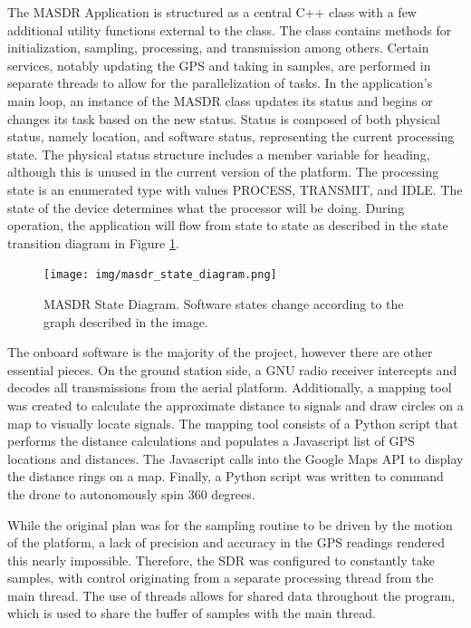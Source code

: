 The MASDR Application is structured as a central C++ class with a few additional utility functions external to the class. The class contains methods for initialization, sampling, processing, and transmission among others. Certain services, notably updating the GPS and taking in samples, are performed in separate threads to allow for the parallelization of tasks. In the application’s main loop, an instance of the MASDR class updates its status and begins or changes its task based on the new status. Status is composed of both physical status, namely location, and software status, representing the current processing state. The physical status structure includes a member variable for heading, although this is unused in the current version of the platform. The processing state is an enumerated type with values PROCESS, TRANSMIT, and IDLE. The state of the device determines what the processor will be doing. During operation, the application will flow from state to state as described in the state transition diagram in Figure \ref{fig:state_diagram}. \par
\begin{figure}[ht]
\centering
\texttt{[image: img/masdr\_state\_diagram.png]}
\caption{MASDR State Diagram. Software states change according to the graph described in the image.}
\label{fig:state_diagram}
\end{figure}
The onboard software is the majority of the project, however there are other essential pieces. On the ground station side, a GNU radio receiver intercepts and decodes all transmissions from the aerial platform. Additionally, a mapping tool was created to calculate the approximate distance to signals and draw circles on a map to visually locate signals. The mapping tool consists of a Python script that performs the distance calculations and populates a Javascript list of GPS locations and distances. The Javascript calls into the Google Maps API to display the distance rings on a map. Finally, a Python script was written to command the drone to autonomously spin 360 degrees. \par
While the original plan was for the sampling routine to be driven by the motion of the platform, a lack of precision and accuracy in the GPS readings rendered this nearly impossible. Therefore, the SDR was configured to constantly take samples, with control originating from a separate processing thread from the main thread. The use of threads allows for shared data throughout the program, which is used to share the  buffer of samples with the main thread. \par
